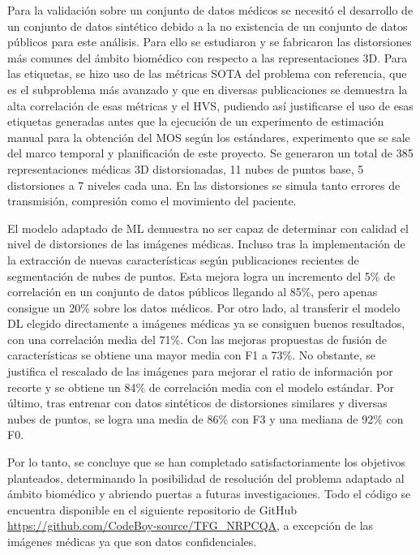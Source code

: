 Para la validación sobre un conjunto de datos médicos se necesitó el desarrollo 
de un conjunto de datos sintético debido a la no existencia de un conjunto de 
datos públicos para este análisis. Para ello se estudiaron y se fabricaron las distorsiones más 
comunes del ámbito biomédico con respecto a las representaciones 3D. Para las etiquetas, 
se hizo uso de las métricas SOTA del problema con referencia, que es el subproblema 
más avanzado y que en diversas publicaciones se demuestra la alta correlación 
de esas métricas y el HVS, pudiendo así justificarse el uso de esas 
etiquetas generadas antes que la ejecución de un experimento de estimación 
manual para la obtención del MOS según los estándares, experimento que se 
sale del marco temporal y planificación de este proyecto. Se generaron 
un total de 385 representaciones médicas 3D distorsionadas, 11 nubes de puntos 
base, 5 distorsiones a 7 niveles cada una. En las distorsiones se simula 
tanto errores de transmisión, compresión como el movimiento del paciente.

El modelo adaptado de ML demuestra no ser capaz de determinar con calidad 
el nivel de distorsiones de las imágenes médicas. Incluso tras la implementación 
de la extracción de nuevas características según publicaciones recientes 
de segmentación de nubes de puntos. Esta mejora logra un incremento del 5\% de correlación en un conjunto de datos públicos llegando al 85\%, pero apenas consigue un 20\% sobre los datos médicos. 
Por otro lado, al transferir el modelo DL elegido directamente a imágenes médicas ya se consiguen 
buenos resultados, con una correlación media del 71\%. Con las mejoras propuestas de 
fusión de características se obtiene una mayor media con F1 a 73\%. No obstante, 
se justifica el rescalado de las imágenes para mejorar el ratio de información 
por recorte y se obtiene un 84\% de correlación media con el modelo estándar. 
Por último, tras entrenar con datos sintéticos de distorsiones similares y 
diversas nubes de puntos, se logra una media de 86\% con F3 y una mediana de 92\% con F0.

Por lo tanto, se concluye que se han completado satisfactoriamente los objetivos 
planteados, determinando la posibilidad de resolución del problema adaptado 
al ámbito biomédico y abriendo puertas a futuras investigaciones. Todo el código
se encuentra disponible en el siguiente repositorio de GitHub \url{https://github.com/CodeBoy-source/TFG_NRPCQA},
a excepción de las imágenes médicas ya que son datos confidenciales.


